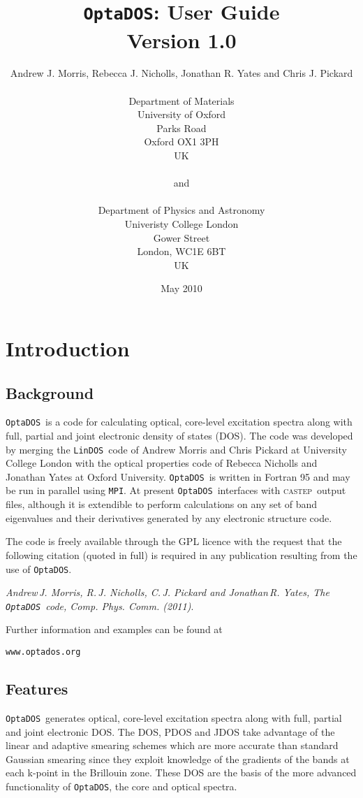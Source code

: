 \documentclass[a4paper,11pt,twoside]{book}
\title{{\huge {\tt OptaDOS}: User Guide}\\ {Version 1.0}}
\author{Andrew J. Morris, Rebecca J. Nicholls, Jonathan R. Yates and Chris J. Pickard \\
\\
Department of Materials\\
University of Oxford\\
Parks Road\\
Oxford OX1 3PH\\
UK \\
\\
{\small and} \\
\\
Department of Physics and Astronomy\\
Univeristy College London\\
Gower Street\\
London, WC1E 6BT\\
UK}
\date{May 2010}
\begin{document}
\newcommand{\optados}{\texttt{OptaDOS}}
\newcommand{\lindos}{\texttt{LinDOS}}
\newcommand{\castep}{\textsc{castep}}
\maketitle

\setcounter{tocdepth}{1}
\tableofcontents

\chapter{Introduction}\label{chap:introduction}
\section{Background}
\optados\ is a code for calculating optical, core-level excitation spectra along with full, partial and joint electronic density of states (DOS).  The code was developed by merging the \lindos\ code of Andrew Morris and Chris Pickard at University College London with the optical properties code of Rebecca Nicholls and Jonathan Yates at Oxford University.  \optados\ is written in Fortran 95 and may be run in parallel using {\tt MPI}.  At present \optados\ interfaces with \castep\ output files, although it is extendible to perform calculations on any set of band eigenvalues and their derivatives generated by any electronic structure code.

The code is freely available through the GPL licence with the request that the following citation (quoted in full) is required in any publication resulting from the use of \optados.

\emph{Andrew\,J. Morris, R.\,J. Nicholls, C.\,J. Pickard and Jonathan\,R. Yates, The \optados\ code, Comp. Phys. Comm. (2011)}.

\begin{center}
Further information and examples can be found at

\verb#www.optados.org#
\end{center}


\section{Features}
\optados\ generates optical, core-level excitation spectra along with full, partial and joint electronic DOS. The DOS, PDOS and JDOS take advantage of the linear and adaptive smearing schemes which are more accurate than standard Gaussian smearing since they exploit knowledge of the gradients of the bands at each k-point in the Brillouin zone.  These DOS are the basis of the more advanced functionality of \optados, the core and optical spectra.
\end{document}
